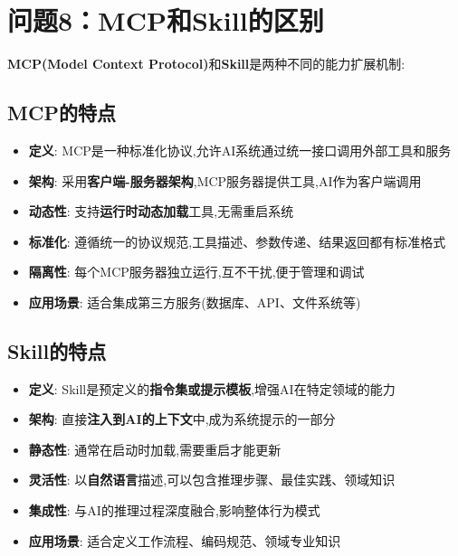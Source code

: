 \documentclass[UTF8]{ctexart}
\begin{document}
\section{问题8：MCP和Skill的区别}

\textbf{MCP(Model Context Protocol)}和\textbf{Skill}是两种不同的能力扩展机制:

\subsection{MCP的特点}
\begin{itemize}
    \item \textbf{定义}: MCP是一种标准化协议,允许AI系统通过统一接口调用外部工具和服务
    \item \textbf{架构}: 采用\textbf{客户端-服务器架构},MCP服务器提供工具,AI作为客户端调用
    \item \textbf{动态性}: 支持\textbf{运行时动态加载}工具,无需重启系统
    \item \textbf{标准化}: 遵循统一的协议规范,工具描述、参数传递、结果返回都有标准格式
    \item \textbf{隔离性}: 每个MCP服务器独立运行,互不干扰,便于管理和调试
    \item \textbf{应用场景}: 适合集成第三方服务(数据库、API、文件系统等)
\end{itemize}

\subsection{Skill的特点}
\begin{itemize}
    \item \textbf{定义}: Skill是预定义的\textbf{指令集或提示模板},增强AI在特定领域的能力
    \item \textbf{架构}: 直接\textbf{注入到AI的上下文}中,成为系统提示的一部分
    \item \textbf{静态性}: 通常在启动时加载,需要重启才能更新
    \item \textbf{灵活性}: 以\textbf{自然语言}描述,可以包含推理步骤、最佳实践、领域知识
    \item \textbf{集成性}: 与AI的推理过程深度融合,影响整体行为模式
    \item \textbf{应用场景}: 适合定义工作流程、编码规范、领域专业知识
\end{itemize}
\end{document}
